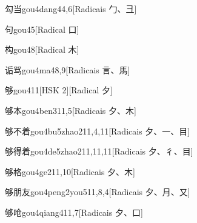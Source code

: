 \begin{entry}{勾当}{gou4dang4}{4,6}[Radicais ⼓、⼹]
\end{entry}

\begin{entry}{句}{gou4}{5}[Radical ⼝]
\end{entry}

\begin{entry}{构}{gou4}{8}[Radical ⽊]
\end{entry}

\begin{entry}{诟骂}{gou4ma4}{8,9}[Radicais ⾔、⾺]
\end{entry}

\begin{entry}{够}{gou4}{11}[HSK 2][Radical ⼣]
\end{entry}

\begin{entry}{够本}{gou4ben3}{11,5}[Radicais ⼣、⽊]
\end{entry}

\begin{entry}{够不着}{gou4bu5zhao2}{11,4,11}[Radicais ⼣、⼀、⽬]
\end{entry}

\begin{entry}{够得着}{gou4de5zhao2}{11,11,11}[Radicais ⼣、⼻、⽬]
\end{entry}

\begin{entry}{够格}{gou4ge2}{11,10}[Radicais ⼣、⽊]
\end{entry}

\begin{entry}{够朋友}{gou4peng2you5}{11,8,4}[Radicais ⼣、⽉、⼜]
\end{entry}

\begin{entry}{够呛}{gou4qiang4}{11,7}[Radicais ⼣、⼝]
\end{entry}

